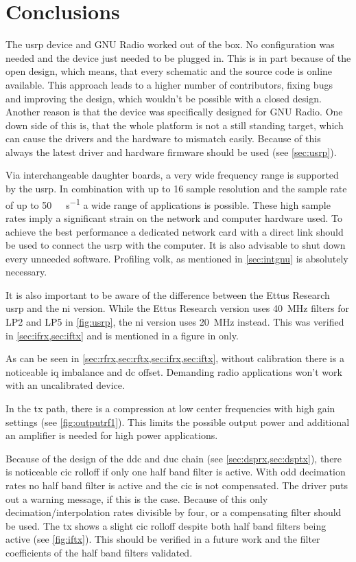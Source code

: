 \documentclass[12pt,a4paper,parskip=full,abstracton]{scrartcl}
\begin{document}
\section{Conclusions}

The \gls{usrp} device and GNU Radio worked out of the box. No configuration
was needed and the device just needed to be plugged in. This is in part because
of the open design, which means, that every schematic and the source code is online
available. This approach leads to a higher number of contributors, fixing bugs
and improving the design, which wouldn't be possible with a closed design. Another
reason is that the device was specifically designed for GNU Radio. One down side
of this is, that the whole platform is not a still standing target, which can cause
the drivers and the hardware to mismatch easily. Because of this always the latest
driver and hardware firmware should be used (see \cref{sec:usrp}).

Via interchangeable daughter boards, a very wide frequency range is supported by
the \gls{usrp}. In combination with up to \SI{16}{\bit} sample resolution and the
sample rate of up to \SI{50}{\mega\samples\per\second} a wide range of applications
is possible. These high sample rates imply a significant strain on the network
and computer hardware used. To achieve the best performance a dedicated network
card with a direct link should be used to connect the \gls{usrp} with the computer.
It is also advisable to shut down every unneeded software. Profiling \gls{volk},
as mentioned in \cref{sec:intgnu} is absolutely necessary.

It is also important to be aware of the difference between the Ettus Research
\gls{usrp} and the \gls{ni} version. While the Ettus Research version uses
\SI{40}{\mega\hertz} filters for LP2 and LP5 in \cref{fig:usrp}, the \gls{ni}
version uses \SI{20}{\mega\hertz} instead. This was verified in
\cref{sec:ifrx,sec:iftx} and is mentioned in a figure in \cite{ni_29xx} only.

As can be seen in \cref{sec:rfrx,sec:rftx,sec:ifrx,sec:iftx}, without calibration
there is a noticeable \gls{iq} imbalance and \gls{dc} offset. Demanding 
radio applications won't work with an uncalibrated device.

In the \Gls{tx} path, there is a compression at low center frequencies with high
gain settings (see \cref{fig:outputrf1}). This limits the possible output power
and additional an amplifier is needed for high power applications.

Because of the design of the \gls{ddc} and \gls{duc} chain (see
\cref{sec:dsprx,sec:dsptx}), there is noticeable \gls{cic} rolloff if only one
half band filter is active. With odd decimation rates no half band filter is
active and the \gls{cic} is not compensated. The driver puts out a warning
message, if this is the case. Because of this only decimation/interpolation rates
divisible by four, or a compensating filter should be used. The \gls{tx} shows
a slight \gls{cic} rolloff despite both half band filters being active (see
\cref{fig:iftx}). This should be verified in a future work and the filter
coefficients of the half band filters validated.
\end{document}
